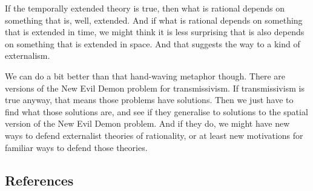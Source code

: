 \documentclass[
  10pt,
  letterpaper,
  DIV=11,
  numbers=noendperiod,
  twoside]{scrartcl}
\begin{document}
If the temporally extended theory is true, then what is rational depends
on something that is, well, extended. And if what is rational depends on
something that is extended in time, we might think it is less surprising
that is also depends on something that is extended in space. And that
suggests the way to a kind of externalism.

We can do a bit better than that hand-waving metaphor though. There are
versions of the New Evil Demon problem for transmissivism. If
transmissivism is true anyway, that means those problems have solutions.
Then we just have to find what those solutions are, and see if they
generalise to solutions to the spatial version of the New Evil Demon
problem. And if they do, we might have new ways to defend externalist
theories of rationality, or at least new motivations for familiar ways
to defend those theories.

\subsection*{References}\label{references}
\end{document}
